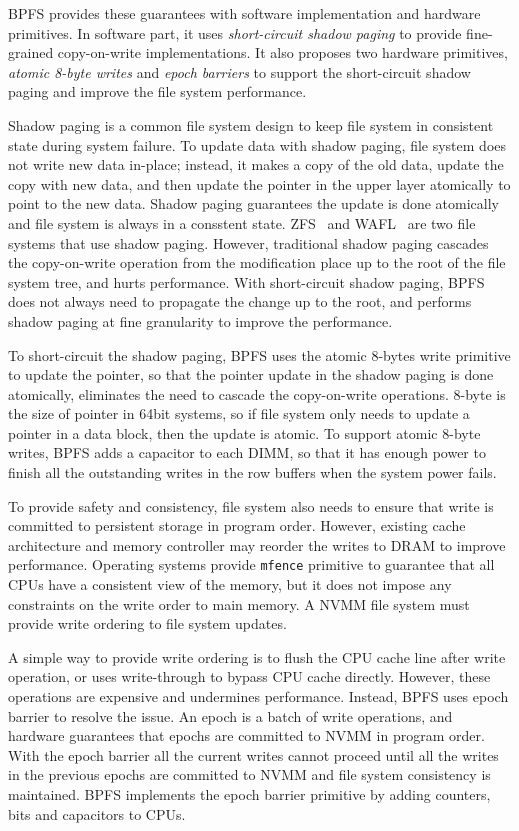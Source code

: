BPFS provides these guarantees with software implementation and hardware
primitives. In software part, it uses \emph{short-circuit shadow paging}
to provide fine-grained copy-on-write implementations. It also proposes
two hardware primitives, \emph{atomic 8-byte writes} and \emph{epoch barriers}
to support the short-circuit shadow paging and improve the file system
performance.

Shadow paging is a common file system design to keep file system in consistent
state during system failure. To update data with shadow paging, file system
does not write new data in-place; instead, it makes a copy of the old data,
update the copy with new data, and then update the pointer in the upper layer
atomically to point to the new data. Shadow paging guarantees the update is done
atomically and file system is always in a consstent state.
 ZFS~\cite{zfs} and WAFL~\cite{wafl} are two file
systems that use shadow paging. However, traditional shadow paging cascades
the copy-on-write operation from the modification place up to the root of 
the file system tree, and hurts performance. With short-circuit shadow paging,
BPFS does not always need to propagate the change up to the root, and performs
shadow paging at fine granularity to improve the performance.

To short-circuit the shadow paging, BPFS uses the atomic 8-bytes write primitive
to update the pointer, so that the pointer update in the shadow paging is done
atomically, eliminates the need to cascade the copy-on-write operations.
8-byte is the size of pointer in 64bit systems, so if file system only needs to
update a pointer in a data block, then the update is atomic. To support
atomic 8-byte writes, BPFS adds a capacitor to each DIMM, so that it has enough
power to finish all the outstanding writes in the row buffers when the system
power fails.

To provide safety and consistency, file system also needs to ensure that write
is committed to persistent storage in program order. However, existing cache
architecture and memory controller may reorder the writes to DRAM to improve
performance. Operating systems provide \texttt{mfence} primitive to guarantee
that all CPUs have a consistent view of the memory, but it does not impose
any constraints on the write order to main memory. A NVMM file system must
provide write ordering to file system updates.

A simple way to provide write ordering is to flush the CPU cache line after
write operation, or uses write-through to bypass CPU cache directly. However,
these operations are expensive and undermines performance. Instead, BPFS uses
epoch barrier to resolve the issue. An epoch is a batch of write operations,
and hardware guarantees that epochs are committed to NVMM in program order.
With the epoch barrier all the current writes cannot proceed until all the
writes in the previous epochs are committed to NVMM and file system consistency
is maintained. BPFS implements the epoch barrier primitive by adding counters,
bits and capacitors to CPUs.

